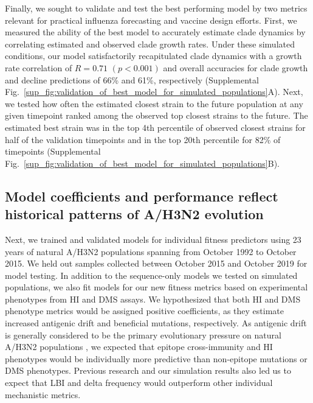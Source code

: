 Finally, we sought to validate and test the best performing model by two metrics relevant for practical influenza forecasting and vaccine design efforts.
First, we measured the ability of the best model to accurately estimate clade dynamics by correlating estimated and observed clade growth rates.
Under these simulated conditions, our model satisfactorily recapitulated clade dynamics with a growth rate correlation of $R = 0.71$ $(p < 0.001)$ and overall accuracies for clade growth and decline predictions of 66\% and 61\%, respectively (Supplemental Fig.~\ref{sup_fig:validation_of_best_model_for_simulated_populations}A).
Next, we tested how often the estimated closest strain to the future population at any given timepoint ranked among the observed top closest strains to the future.
The estimated best strain was in the top 4th percentile of observed closest strains for half of the validation timepoints and in the top 20th percentile for 82\% of timepoints (Supplemental Fig.~\ref{sup_fig:validation_of_best_model_for_simulated_populations}B).

\subsection*{Model coefficients and performance reflect historical patterns of A/H3N2 evolution}

Next, we trained and validated models for individual fitness predictors using 23 years of natural A/H3N2 populations spanning from October 1992 to October 2015.
We held out samples collected between October 2015 and October 2019 for model testing.
In addition to the sequence-only models we tested on simulated populations, we also fit models for our new fitness metrics based on experimental phenotypes from HI and DMS assays.
We hypothesized that both HI and DMS phenotype metrics would be assigned positive coefficients, as they estimate increased antigenic drift and beneficial mutations, respectively.
As antigenic drift is generally considered to be the primary evolutionary pressure on natural A/H3N2 populations \cite{Smith:2004jc,Bedford:2014bf,Luksza:2014hj}, we expected that epitope cross-immunity and HI phenotypes would be individually more predictive than non-epitope mutations or DMS phenotypes.
Previous research \cite{Neher:2016hy} and our simulation results also led us to expect that LBI and delta frequency would outperform other individual mechanistic metrics.

